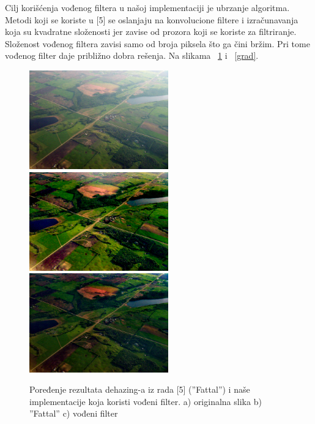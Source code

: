 \documentclass[a4paper,12pt,titlepage]{article}
\begin{document}
Cilj korišćenja vođenog filtera u našoj implementaciji je ubrzanje algoritma. Metodi koji se koriste u [5] se oslanjaju na konvolucione filtere i izračunavanja koja su kvadratne složenosti jer zavise od prozora koji se koriste za filtriranje. Složenost vođenog filtera zavisi samo od broja piksela što ga čini bržim. Pri tome vođenog filter daje približno dobra rešenja. Na slikama ~\ref{aerial} i ~\ref{grad}. 

\begin{figure}[ht!]
\centering
\includegraphics[width=60mm]{img/aerial.png}
\includegraphics[width=60mm]{img/aerialFattal.png}
\includegraphics[width=60mm]{img/aerialDe.png}
\caption{Poređenje rezultata dehazing-a iz rada [5] (''Fattal'') i naše implementacije koja koristi vođeni filter. a) originalna slika b) ''Fattal'' c) vođeni filter}
\label{aerial}
\end{figure} 
\end{document}
